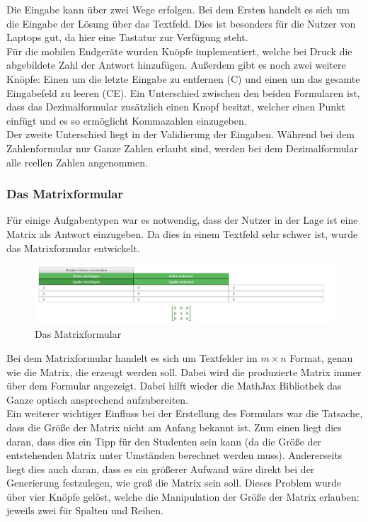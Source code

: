 Die Eingabe kann über zwei Wege erfolgen. Bei dem Ersten handelt es sich um die Eingabe der Lösung über das Textfeld. Dies ist besonders für die Nutzer von Laptops gut, da hier eine Tastatur zur Verfügung steht. \\
Für die mobilen Endgeräte wurden Knöpfe implementiert, welche bei Druck die abgebildete Zahl der Antwort hinzufügen. Außerdem gibt es noch zwei weitere Knöpfe: Einen um die letzte Eingabe zu entfernen (C) und einen um das gesamte Eingabefeld zu leeren (CE). Ein Unterschied zwischen den beiden Formularen ist, dass das Dezimalformular zusätzlich einen Knopf besitzt, welcher einen Punkt einfügt und es so ermöglicht Kommazahlen einzugeben. \\
Der zweite Unterschied liegt in der Validierung der Eingaben. Während bei dem Zahlenformular nur Ganze Zahlen erlaubt sind, werden bei dem Dezimalformular alle reellen Zahlen angenommen.

\subsubsection{Das Matrixformular}

Für einige Aufgabentypen war es notwendig, dass der Nutzer in der Lage ist eine Matrix als Antwort einzugeben. Da dies in einem Textfeld sehr schwer ist, wurde das Matrixformular entwickelt. \\

\begin{figure}[htp]     %
\centering
\includegraphics[width=1\textwidth]{bilder/MatrixForm} 
\caption[Das Matrixformular]{Das Matrixformular}
\end{figure} 

Bei dem Matrixformular handelt es sich um Textfelder im $ m\times n$ Format, genau wie die Matrix, die erzeugt werden soll. Dabei wird die produzierte Matrix immer über dem Formular angezeigt. Dabei hilft wieder die MathJax Bibliothek das Ganze optisch ansprechend aufzubereiten. \\

Ein weiterer wichtiger Einfluss bei der Erstellung des Formulars war die Tatsache, dass die Größe der Matrix nicht am Anfang bekannt ist. Zum einen liegt dies daran, dass dies ein Tipp für den Studenten sein kann (da die Größe der entstehenden Matrix unter Umständen berechnet werden muss). Andererseits liegt dies auch daran, dass es ein größerer Aufwand wäre direkt bei der Generierung festzulegen, wie groß die Matrix sein soll. Dieses Problem wurde über vier Knöpfe gelöst, welche die Manipulation der Größe der Matrix erlauben: jeweils zwei für Spalten und Reihen. \\

